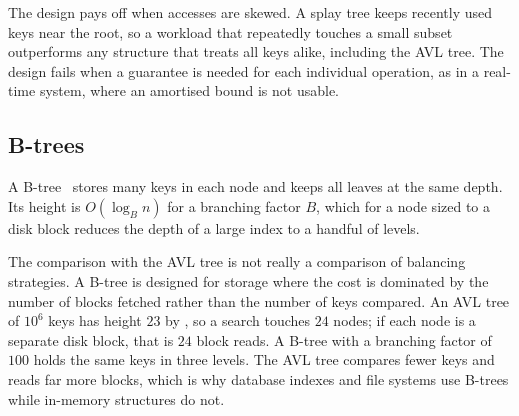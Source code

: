 The design pays off when accesses are skewed. A splay tree keeps recently used
keys near the root, so a workload that repeatedly touches a small subset
outperforms any structure that treats all keys alike, including the AVL tree.
The design fails when a guarantee is needed for each individual operation, as in
a real-time system, where an amortised bound is not usable.

\subsection{B-trees}

A B-tree~\cite{bayer1972} stores many keys in each node and keeps all leaves at the same depth.
Its height is $O(\log_B n)$ for a branching factor $B$, which for a node sized to
a disk block reduces the depth of a large index to a handful of levels.

The comparison with the AVL tree is not really a comparison of balancing
strategies. A B-tree is designed for storage where the cost is dominated by the
number of blocks fetched rather than the number of keys compared. An AVL tree of
$10^{6}$ keys has height $23$ by , so a search touches $24$
nodes; if each node is a separate disk block, that is $24$ block reads. A B-tree
with a branching factor of $100$ holds the same keys in three levels. The AVL
tree compares fewer keys and reads far more blocks, which is why database indexes
and file systems use B-trees while in-memory structures do not.
